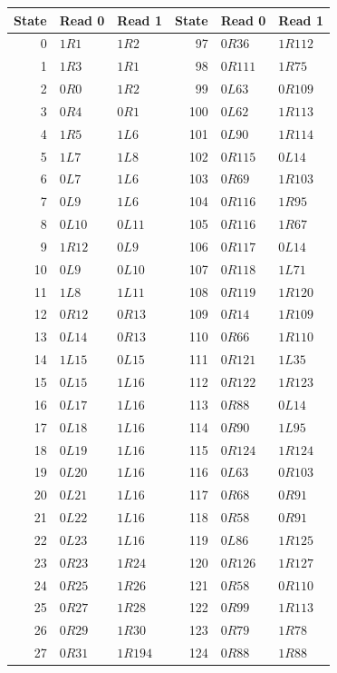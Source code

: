 {\small
\begin{longtable}{rll@{\qquad}rll}
\toprule
State & Read 0 & Read 1 & State & Read 0 & Read 1\\
\midrule\endhead
0 & $1R1$ & $1R2$ & 97 & $0R36$ & $1R112$\\
1 & $1R3$ & $1R1$ & 98 & $0R111$ & $1R75$\\
2 & $0R0$ & $1R2$ & 99 & $0L63$ & $0R109$\\
3 & $0R4$ & $0R1$ & 100 & $0L62$ & $1R113$\\
4 & $1R5$ & $1L6$ & 101 & $0L90$ & $1R114$\\
5 & $1L7$ & $1L8$ & 102 & $0R115$ & $0L14$\\
6 & $0L7$ & $1L6$ & 103 & $0R69$ & $1R103$\\
7 & $0L9$ & $1L6$ & 104 & $0R116$ & $1R95$\\
8 & $0L10$ & $0L11$ & 105 & $0R116$ & $1R67$\\
9 & $1R12$ & $0L9$ & 106 & $0R117$ & $0L14$\\
10 & $0L9$ & $0L10$ & 107 & $0R118$ & $1L71$\\
11 & $1L8$ & $1L11$ & 108 & $0R119$ & $1R120$\\
12 & $0R12$ & $0R13$ & 109 & $0R14$ & $1R109$\\
13 & $0L14$ & $0R13$ & 110 & $0R66$ & $1R110$\\
14 & $1L15$ & $0L15$ & 111 & $0R121$ & $1L35$\\
15 & $0L15$ & $1L16$ & 112 & $0R122$ & $1R123$\\
16 & $0L17$ & $1L16$ & 113 & $0R88$ & $0L14$\\
17 & $0L18$ & $1L16$ & 114 & $0R90$ & $1L95$\\
18 & $0L19$ & $1L16$ & 115 & $0R124$ & $1R124$\\
19 & $0L20$ & $1L16$ & 116 & $0L63$ & $0R103$\\
20 & $0L21$ & $1L16$ & 117 & $0R68$ & $0R91$\\
21 & $0L22$ & $1L16$ & 118 & $0R58$ & $0R91$\\
22 & $0L23$ & $1L16$ & 119 & $0L86$ & $1R125$\\
23 & $0R23$ & $1R24$ & 120 & $0R126$ & $1R127$\\
24 & $0R25$ & $1R26$ & 121 & $0R58$ & $0R110$\\
25 & $0R27$ & $1R28$ & 122 & $0R99$ & $1R113$\\
26 & $0R29$ & $1R30$ & 123 & $0R79$ & $1R78$\\
27 & $0R31$ & $1R194$ & 124 & $0R88$ & $1R88$\\

\end{longtable}}
